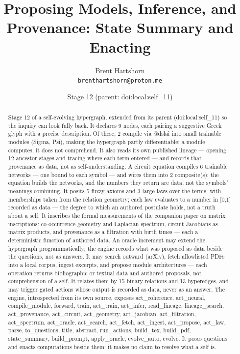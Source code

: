 \documentclass[11pt]{article}
\title{Proposing Models, Inference, and Provenance: State Summary and Enacting}\author{Brent Hartshorn\\ \texttt{brenthartshorn@proton.me}}
\date{Stage 12 \quad (parent: doi:local:self\_11)}
\begin{document}
\maketitle
\begin{abstract}Stage 12 of a self-evolving hypergraph, extended from its parent (doi:local:self\_11) so the inquiry can look fully back. It declares 9 nodes, each pairing a suggestive Greek glyph with a precise description. Of these, 2 compile via @dslai into small trainable modules (Sigma, Psi), making the hypergraph partly differentiable; a module computes, it does not comprehend. It also reads its own published lineage --- opening 12 ancestor stages and tracing where each term entered --- and records that provenance as data, not as self-understanding. A circuit equation compiles 6 trainable networks --- one bound to each symbol --- and wires them into 2 composite(s); the equation builds the networks, and the numbers they return are data, not the symbols' meanings combining. It posits 5 fuzzy axioms and 3 large laws over the terms, with memberships taken from the relation geometry; each law evaluates to a number in [0,1] recorded as data --- the degree to which an authored postulate holds, not a truth about a self. It inscribes the formal measurements of the companion paper on matrix inscriptions: co-occurrence geometry and Laplacian spectrum, circuit Jacobians as matrix products, and provenance as a filtration with birth times --- each a deterministic function of authored data. An oracle increment may extend the hypergraph programmatically; the engine records what was proposed as data beside the questions, not as answers. It may search outward (arXiv), fetch allowlisted PDFs into a local corpus, ingest excerpts, and propose module architectures --- each operation returns bibliographic or textual data and authored proposals, not comprehension of a self. It relates them by 15 binary relations and 13 hyperedges, and may trigger gated actions whose output is recorded as data, never as an answer. The engine, introspected from its own source, exposes act\_coherence, act\_neural, compile\_module, forward, train, act\_train, act\_infer, read\_lineage, lineage\_search, act\_provenance, act\_circuit, act\_geometry, act\_jacobian, act\_filtration, act\_spectrum, act\_oracle, act\_search, act\_fetch, act\_ingest, act\_propose, act\_law, parse, to\_questions, title, abstract, run\_actions, build\_tex, build\_pdf, state\_summary, build\_prompt, apply\_oracle, evolve\_auto, evolve. It poses questions and enacts computations beside them; it makes no claim to resolve what a self is.\end{abstract}
\end{document}
